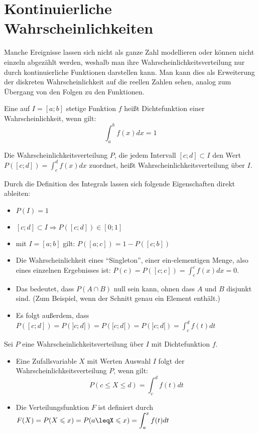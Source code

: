 \documentclass[main.tex]{subfiles}
\begin{document}
\section{Kontinuierliche Wahrscheinlichkeiten}
Manche Ereignisse lassen sich nicht als ganze Zahl modellieren oder können nicht einzeln abgezählt werden, weshalb man ihre Wahrscheinlichkeitsverteilung nur durch kontinuierliche Funktionen darstellen kann. Man kann dies als Erweiterung der diskreten Wahrscheinlichkeit auf die reellen Zahlen sehen, analog zum Übergang von den Folgen zu den Funktionen.
\begin{Definition}[Dichtefunktion]
  Eine auf $I = [a;b]$ stetige Funktion $f$ heißt Dichtefunktion einer Wahrscheinlichkeit, wenn gilt:
  $$\int_{a}^{b} f(x)dx =1$$
\end{Definition}
\begin{Definition}
  Die Wahrscheinlichkeitsverteilung $P$, die jedem Intervall $[c;d] \subset I$ den Wert $P([c;d]) = \displaystyle \int_c^d f(x)dx$ zuordnet, heißt Wahrscheinlichkeitsverteilung über $I$.
\end{Definition}
\begin{Bemerkung}
  Durch die Definition des Integrals lassen sich folgende Eigenschaften direkt ableiten:
  \begin{itemize}
    \item $P(I)=1$
    \item $[c;d] \subset I \Rightarrow P([c;d])\in [0;1]$
    \item mit $I = [a;b]$ gilt: $P([a;c]) = 1- P([c;b])$
    \item Die Wahrscheinlichkeit eines ``Singleton'', einer ein-elementigen Menge, also eines einzelnen Ergebnisses ist:
    $P({c})=P([c;c])=\displaystyle\int_c^c f(x)dx =0$.
    \item Das bedeutet, dass $P(A \cap B)$ null sein kann, ohnen dass $A$ und $B$ disjunkt sind. (Zum Beispiel, wenn der Schnitt genau ein Element enthält.)
    \item Es folgt außerdem, dass $P([c;d])=P(]c;d])=P([c;d[)=P(]c;d[)=\displaystyle\int_c^d f(t)dt$
  \end{itemize}
\end{Bemerkung}
\begin{Definition}
  Sei $P$ eine Wahrscheinlichkeitsverteilung über $I$ mit Dichtefunktion $f$.\\
  \begin{itemize}
    \item Eine Zufallsvariable $X$ mit Werten Auswahl $I$ folgt der Wahrscheinlichkeitsverteilung $P$, wenn gilt: $$P(c\leq X \leq d)=\displaystyle \int_c^d f(t)dt$$
    \item Die Verteilungsfunktion $F$ ist definiert durch $F(X)=P(X\leq x)=P(a\leqX\leq x)=\displaystyle\int_a^x f(t)dt$
  \end{itemize}
\end{Definition}
\end{document}
